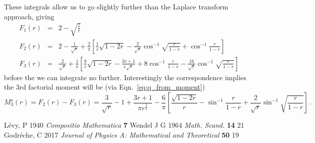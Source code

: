 \documentclass{article}
\begin{document}
These integrals allow us to go slightly further than the Laplace transform approach, giving
\begin{eqnarray}
  F_1(r) &=& 2 - \sqrt{\frac{1}{r}} \\
  F_2(r) &=&  2 - \frac{1}{\sqrt{r}} + \frac{2}{\pi}\left[\frac{1}{r}\sqrt{1-2r}-\frac{2}{\sqrt{r}} \cos^{-1} \sqrt{\frac{r}{1-r}} + \cos^{-1}\frac{r}{1-r}\right] \\
  F_3(r) &=& \frac{2}{\sqrt{r}} + \frac{1}{\pi}\left[\frac{8}{r}\sqrt{1-2r}-\frac{3r+1}{r\sqrt{r}} + 8 \cos^{-1} \frac{r}{1-r} - \frac{16}{\sqrt{r}}\cos^{-1}\sqrt{\frac{r}{1-r}}\right]
\end{eqnarray}
before the we can integrate no further. Interestingly the correspondence implies the 3rd factorial moment will be (via Eqn.~\ref{eq:q_from_moment})
\begin{equation}
  M^\star_3(r) = F_2(r) - F_3(r) = \frac{3}{\sqrt{r}} - 1 + \frac{3r+1}{\pi r^{\frac{3}{2}}} - \frac{6}{\pi}\left[\frac{\sqrt{1-2r}}{r} - \sin^{-1}\frac{r}{1-r}  +\frac{2}{\sqrt{r}} \sin^{-1}\sqrt{\frac{r}{1-r}}\right] \, .
\end{equation}

\begin{thebibliography}{9}
 L\'evy, P 1940 {\it Compositio Mathematica} {\bf 7}
 Wendel J G 1964 {\it Math. Scand.} {\bf 14} 21
 Godr\'eche, C 2017 {\it Journal of Physics A: Mathematical and Theoretical} {\bf 50} 19    
\end{thebibliography}
\end{document}
